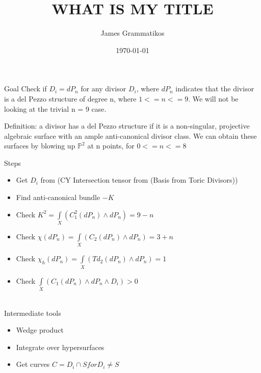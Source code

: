 \documentclass[12pt]{article}
\title{WHAT IS MY TITLE}
\author{James Grammatikos}
\date{\today}
\begin{document}
\maketitle

\fontsize{14}{20}
\selectfont


Goal Check if $D_i = dP_n$ for any divisor $D_i$, where $dP_n$ indicates that the divisor is a del Pezzo structure of degree n, where $1 <= n <= 9$. We will not be looking at the trivial n = 9 case.

Definition: a divisor has a del Pezzo structure if it is a non-singular, projective algebraic surface with an ample anti-canonical divisor class. We can obtain these surfaces by blowing up $\mathbb{P}^2$ at n points, for $0 <= n <= 8$

Steps
\begin{itemize}
\item Get $D_i$ from (CY Intersection tensor from (Basis from Toric Divisors))

\item Find anti-canonical bundle $-K$

\item Check $K^2 = \displaystyle \int \limits_{X}(C_1^2(dP_n) \wedge dP_n) = 9 - n$

\item Check $\chi(dP_n) = \displaystyle \int \limits_{X} (C_2(dP_n) \wedge dP_n) = 3 + n$

\item Check $\chi_h(dP_n) = \displaystyle \int \limits_{X} (Td_2(dP_n) \wedge dP_n) = 1$

\item Check $\displaystyle \int \limits_{X} (C_1(dP_n) \wedge dP_n \wedge D_i) > 0$
\\
\\

\end{itemize}

Intermediate tools
\begin{itemize}
\item Wedge product 

\item Integrate over hypersurfaces

\item Get curves $C = D_i \cap S for D_i \neq S$
\end{itemize}
\end{document}
